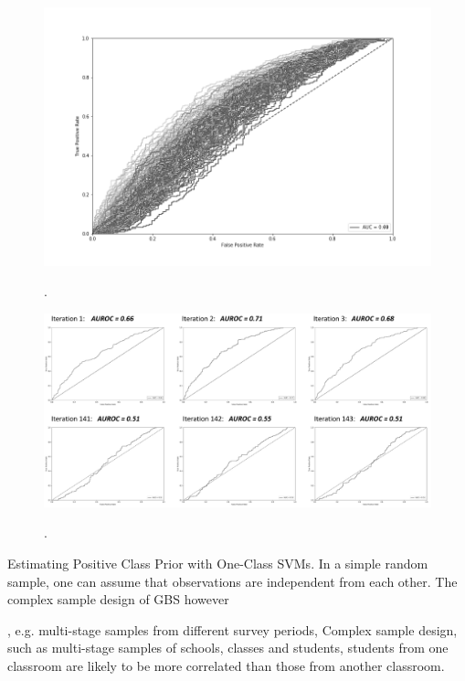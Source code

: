 \begin{figure}[ht]
	\begin{center}
		\includegraphics[scale=0.55,angle=0]{fig/Roc_all}
		\label{occ}
		\vspace*{-1.0cm}
		\caption{.}
	\end{center}
\end{figure}

\begin{figure}[ht]
	\begin{center}
		\includegraphics[scale=0.40,angle=0]{fig/Discriminative_Procedure}
		\label{occ}
		\vspace*{-1.0cm}
		\caption{.}
	\end{center}
\end{figure}

Estimating Positive Class Prior with One-Class SVMs. In a simple random sample, one can assume that observations are independent from each other. The complex sample design of GBS however

, e.g. multi-stage samples from different survey periods,
Complex sample design, such as multi-stage samples of schools, classes and students, students from one classroom are likely to be more correlated than those from another classroom. 

